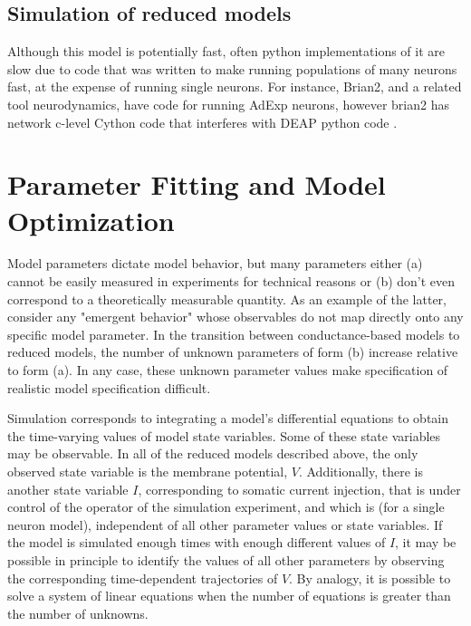 
\subsection{Simulation of reduced models}
Although this model is potentially fast, often python implementations of it are slow due to code that was written to make running populations of many neurons fast, at the expense of running single neurons. 
For instance, Brian2, and a related tool neurodynamics, have code for running AdExp neurons, however brian2 has network c-level Cython code that interferes with DEAP python code \cite{DEAP_JMLR2012}.
\\
\section{Parameter Fitting and Model Optimization}
Model parameters dictate model behavior, but many parameters either (a) cannot be easily measured in experiments for technical reasons or (b) don't even correspond to a theoretically measurable quantity.
As an example of the latter, consider any "emergent behavior" whose observables do not map directly onto any specific model parameter.
In the transition between conductance-based models to reduced models, the number of unknown parameters of form (b) increase relative to form (a).
In any case, these unknown parameter values make specification of realistic model specification difficult.

Simulation corresponds to integrating a model's differential equations to obtain the time-varying values of model state variables.
Some of these state variables may be observable.
In all of the reduced models described above, the only observed state variable is the membrane potential, $V$.
Additionally, there is another state variable $I$, corresponding to somatic current injection, that is under control of the operator of the simulation experiment, and which is (for a single neuron model), independent of all other parameter values or state variables.
If the model is simulated enough times with enough different values of $I$, it may be possible in principle to identify the values of all other parameters by observing the corresponding time-dependent trajectories of $V$.
By analogy, it is possible to solve a system of linear equations when the number of equations is greater than the number of unknowns.

